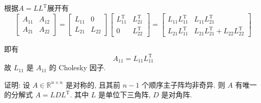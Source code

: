 \documentclass[12pt, answers]{exam}     %
\newcommand{\R}{\mathbb{R}}
\newcommand{\T}{\mathrm{T}}
\begin{document}
\begin{questions}
\begin{solution}
根据\( A = LL^{\T} \)展开有 
\[
\begin{bmatrix}
A_{11} & A_{12} \\
A_{21} & A_{22}
\end{bmatrix}
= 
\begin{bmatrix}
L_{11} & 0 \\
L_{21} & L_{22}
\end{bmatrix}
\begin{bmatrix}
L_{11}^{\T} & L_{21}^{\T} \\
0 & L_{22}^{\T}
\end{bmatrix}
= 
\begin{bmatrix}
L_{11}L_{11}^{\T} & L_{11}L_{21}^{\T} \\
L_{21}L_{11}^{\T} & L_{21}L_{21}^{\T} + L_{22}L_{22}^{\T}
\end{bmatrix}
\]

即有
\[
A_{11} = L_{11}L_{11}^{\T}
\]
故 \( L_{11} \) 是 \( A_{11} \) 的 Cholesky 因子.
\end{solution}

\question{}
证明: 设 \( A \in \R^{n \times n} \) 是对称的, 且其前 \( n-1 \) 个顺序主子阵均非奇异. 则 \( A \) 有唯一的分解式
\( A = LDL^{\T} \). 其中 \( L \) 是单位下三角阵, \( D \) 是对角阵. 


\end{questions}
\end{document}
